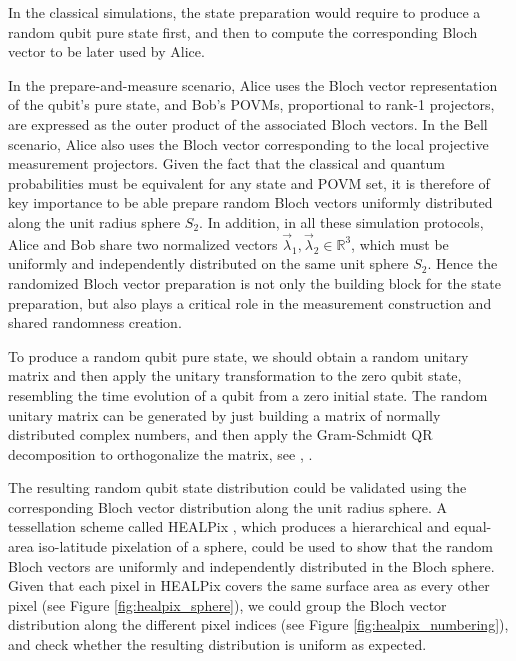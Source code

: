 In the classical simulations, the state preparation would require to produce a random qubit pure state first, and then to compute the corresponding Bloch vector to be later used by Alice. 

In the prepare-and-measure scenario, Alice uses the Bloch vector representation of the qubit's pure state, and Bob's POVMs,  proportional to rank-1 projectors, are expressed as the outer product of the associated Bloch vectors. In the Bell scenario, Alice also uses the Bloch vector corresponding to the local projective measurement projectors. Given the fact that the classical and quantum probabilities must be equivalent for any state and POVM set, it is therefore of key importance to be able prepare random Bloch vectors uniformly distributed along the unit radius sphere $S_2$. In addition, in all these simulation protocols, Alice and Bob share two normalized vectors $\vec{\lambda}_1, \vec{\lambda}_2 \in \mathbb{R}^{3}$, which must be uniformly and independently distributed on the same unit sphere $S_2$. Hence the randomized Bloch vector preparation is not only the building block for the state preparation, but also plays a critical role in the measurement construction and shared randomness creation.

To produce a random qubit pure state, we should obtain a random unitary matrix and then apply the unitary transformation to the zero qubit state, resembling the time evolution of a qubit from a zero initial state. The random unitary matrix can be generated by just building a matrix of normally distributed complex numbers, and then apply the Gram-Schmidt QR decomposition to orthogonalize the matrix, see \cite{ozols2009}, \cite{zyczkowski1994}. 

The resulting random qubit state distribution could be validated using the corresponding Bloch vector distribution along the unit radius sphere. A tessellation scheme called HEALPix \cite{healpix}, which produces a hierarchical and equal-area iso-latitude pixelation of a sphere, could be used to show that the random Bloch vectors are uniformly and independently distributed in the Bloch sphere. Given that each pixel in HEALPix covers the same surface area as every other pixel (see Figure \ref{fig:healpix_sphere}), we could group the Bloch vector distribution along the different pixel indices (see Figure \ref{fig:healpix_numbering}), and check whether the resulting distribution is uniform as expected.


